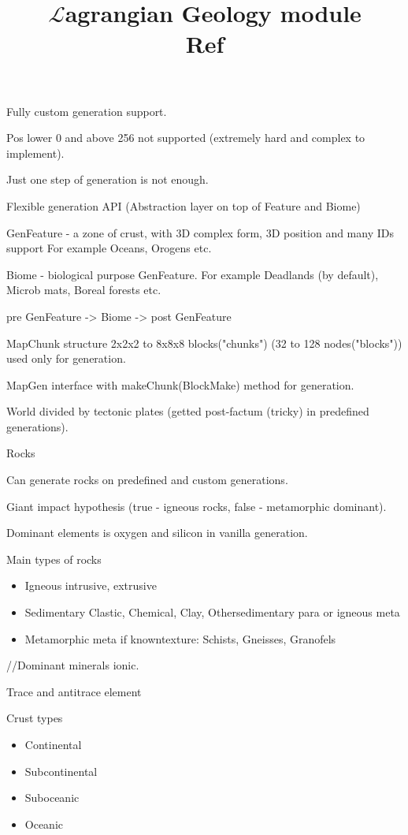 \documentclass[12pt]{article}
\title{$\mathcal{L}$agrangian Geology module \\ Ref}
\begin{document}
    \maketitle

    Fully custom generation support.

    Pos lower 0 and above 256 not supported (extremely hard and complex to implement).

    Just one step of generation is not enough.

    Flexible generation API (Abstraction layer on top of Feature and Biome)

    GenFeature - a zone of crust, with 3D complex form, 3D position and many IDs support
    For example Oceans, Orogens etc.

    Biome - biological purpose GenFeature.
    For example Deadlands (by default), Microb mats, Boreal forests etc.

    pre GenFeature -> Biome -> post GenFeature

    MapChunk structure 2x2x2 to 8x8x8 blocks("chunks") (32 to 128 nodes("blocks")) used only for generation.

    MapGen interface with makeChunk(BlockMake) method for generation.

    World divided by tectonic plates (getted post-factum (tricky) in predefined generations).

    Rocks

    Can generate rocks on predefined and custom generations.  

    Giant impact hypothesis (true - igneous rocks, false - metamorphic dominant).

    Dominant elements is oxygen and silicon in vanilla generation.

    Main types of rocks

    \begin{itemize}
		\item Igneous {intrusive, extrusive}
        \item Sedimentary {Clastic, Chemical, Clay, Other}{sedimentary para or igneous meta}
        \item Metamorphic {meta if known}{texture: Schists, Gneisses, Granofels}
    \end{itemize}
    
    //Dominant minerals ionic.

    Trace and antitrace element

    Crust types

    \begin{itemize}
		\item Continental
        \item Subcontinental
        \item Suboceanic
        \item Oceanic
    \end{itemize}
\end{document}
